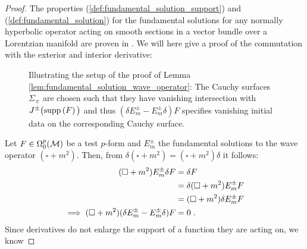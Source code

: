 \begin{proof}
The properties (\ref{def:fundamental_solution_support}) and (\ref{def:fundamental_solution}) for the fundamental solutions for any normally hyperbolic operator acting on smooth sections in a vector bundle over a Lorentzian manifold are proven in \cite[Corollary 3.4.3]{baer_ginoux_pfaeffle}.
We will here give a proof of the commutation with the exterior and interior derivative:
	\begin{figure}[h]
		\begin{center}
		\end{center}
		\caption{Illustrating the setup of the proof of Lemma \ref{lem:fundamental_solution_wave_operator}: The Cauchy surfaces $\Sigma_\mp$ are chosen such that they have vanishing intersection with $J^\pm\big( \text{\upshape{supp}}\left(F\right)\big)$ and thus $(\delta E^\pm_m - E^\pm_m \delta) F $ specifies vanishing initial data on the corresponding Cauchy surface.}
		\label{fig:fund_solutions}
	\end{figure}
Let $F \in \Omega^p_0(\mathcal{M})$ be a test $p$-form and $E^\pm_m$ the fundamental solutions to the wave operator $(\square + m^2)$.
Then, from $\delta (\square + m^2) =(\square + m^2) \delta $ it follows:
\begin{align}
(\square + m^2)  E^\pm_m \delta F
&= \delta  F \notag \\
&= \delta (\square +m^2) E^\pm_m F \notag\\
&= (\square + m^2) \delta E^\pm_m F \notag \\
\implies (\square + m^2)(\delta E^\pm_m - E^\pm_m \delta) F &= 0 \;.
\end{align}
Since derivatives do not enlarge the support of a function they are acting on, we know

\end{proof}
